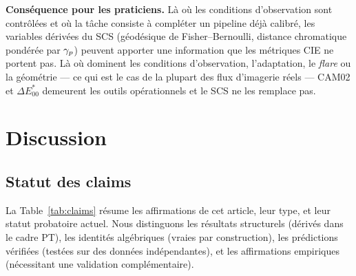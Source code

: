 \documentclass[12pt,a4paper]{article}
\begin{document}
\medskip\noindent\textbf{Cons\'equence pour les praticiens.} L\`a
o\`u les conditions d'observation sont contr\^ol\'ees et o\`u la
t\^ache consiste \`a compl\'eter un pipeline d\'ej\`a calibr\'e, les
variables d\'eriv\'ees du SCS (g\'eod\'esique de Fisher--Bernoulli,
distance chromatique pond\'er\'ee par $\gamma_{p}$) peuvent apporter
une information que les m\'etriques CIE ne portent pas. L\`a o\`u
dominent les conditions d'observation, l'adaptation, le \emph{flare}
ou la g\'eom\'etrie --- ce qui est le cas de la plupart des flux
d'imagerie r\'eels --- CAM02 et $\Delta E^*_{00}$ demeurent les outils
op\'erationnels et le SCS ne les remplace pas.

\section{Discussion}
\label{sec:discussion}

\subsection{Statut des claims}

La Table~\ref{tab:claims} r\'esume les affirmations de cet article,
leur type, et leur statut probatoire actuel. Nous distinguons les
r\'esultats structurels (d\'eriv\'es dans le cadre PT), les identit\'es
alg\'ebriques (vraies par construction), les pr\'edictions v\'erifi\'ees
(test\'ees sur des donn\'ees ind\'ependantes), et les affirmations
empiriques (n\'ecessitant une validation compl\'ementaire).
\end{document}
